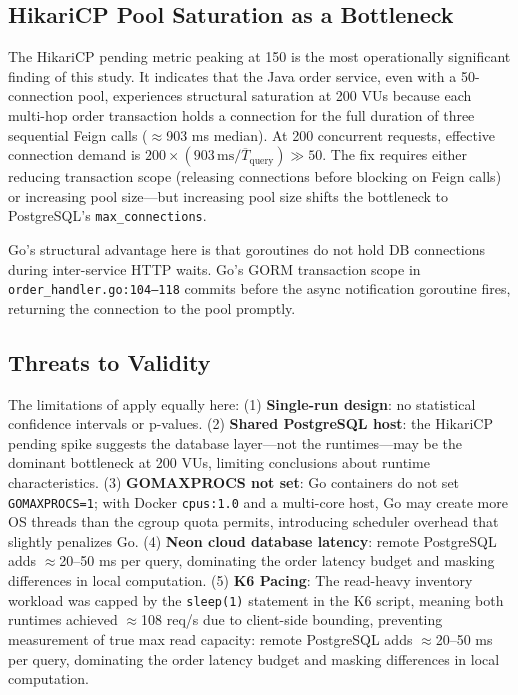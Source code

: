 \documentclass[conference]{IEEEtran}
\begin{document}
\subsection{HikariCP Pool Saturation as a Bottleneck}

The HikariCP pending metric peaking at 150 is the most operationally significant finding of this study. It indicates that the Java order service, even with a 50-connection pool, experiences structural saturation at 200 VUs because each multi-hop order transaction holds a connection for the full duration of three sequential Feign calls ($\approx$903 ms median). At 200 concurrent requests, effective connection demand is $200 \times (903\,\text{ms} / \overline{T}_{\text{query}}) \gg 50$. The fix requires either reducing transaction scope (releasing connections before blocking on Feign calls) or increasing pool size---but increasing pool size shifts the bottleneck to PostgreSQL's \texttt{max\_connections}.

Go's structural advantage here is that goroutines do not hold DB connections during inter-service HTTP waits. Go's GORM transaction scope in \texttt{order\_handler.go:104--118} commits before the async notification goroutine fires, returning the connection to the pool promptly.

\subsection{Threats to Validity}

The limitations of \cite{b10} apply equally here:
(1) \textbf{Single-run design}: no statistical confidence intervals or p-values.
(2) \textbf{Shared PostgreSQL host}: the HikariCP pending spike suggests the database layer---not the runtimes---may be the dominant bottleneck at 200 VUs, limiting conclusions about runtime characteristics.
(3) \textbf{GOMAXPROCS not set}: Go containers do not set \texttt{GOMAXPROCS=1}; with Docker \texttt{cpus:1.0} and a multi-core host, Go may create more OS threads than the cgroup quota permits, introducing scheduler overhead that slightly penalizes Go.
(4) \textbf{Neon cloud database latency}: remote PostgreSQL adds $\approx$20--50 ms per query, dominating the order latency budget and masking differences in local computation.
(5) \textbf{K6 Pacing}: The read-heavy inventory workload was capped by the \texttt{sleep(1)} statement in the K6 script, meaning both runtimes achieved $\approx$108 req/s due to client-side bounding, preventing measurement of true max read capacity: remote PostgreSQL adds $\approx$20--50 ms per query, dominating the order latency budget and masking differences in local computation.
\end{document}
